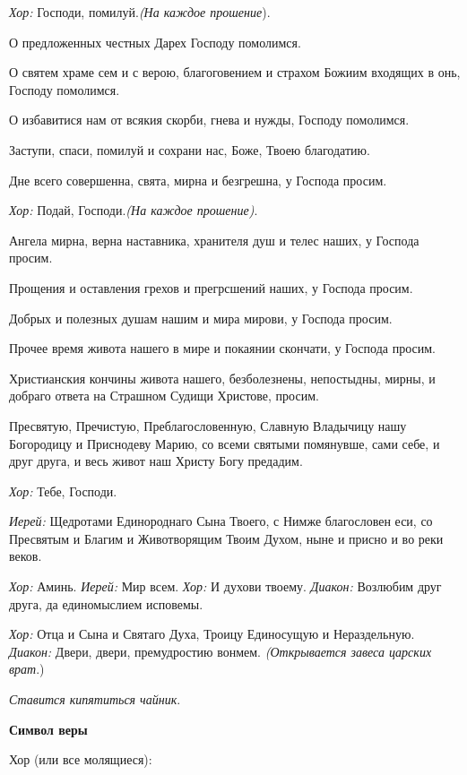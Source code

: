 {\itshape    Хор:} Господи, помилуй.{\itshape  (На каждое прошение}). 

   О предложенных честных Дарех Господу помолимся. 

   О святем храме сем и с верою, благоговением и страхом Божиим входящих в онь, Господу помолимся. 

   О избавитися нам от всякия скорби, гнева и нужды, Господу помолимся. 

   Заступи, спаси, помилуй и сохрани нас, Боже, Твоею благодатию. 

   Дне всего совершенна, свята, мирна и безгрешна, у Господа просим. 

{\itshape    Хор:} Подай, Господи.{\itshape  (На каждое прошение)}. 

   Ангела мирна, верна наставника, хранителя душ и телес наших, у Господа просим. 

   Прощения и оставления грехов и прегрсшений наших, у Господа просим. 

   Добрых и полезных душам нашим и мира мирови, у Господа просим. 

   Прочее время живота нашего в мире и покаянии скончати, у Господа просим. 

   Христианския кончины живота нашего, безболезнены, непостыдны, мирны, и добраго ответа на Страшном Судищи Христове, просим. 

   Пресвятую, Пречистую, Преблагословенную, Славную Владычицу нашу Богородицу и Приснодеву Марию, со всеми святыми помянувше, сами себе, и друг друга, и весь живот наш Христу Богу предадим.

 {\itshape Хор:} Тебе, Господи.

 {\itshape Иерей:} Щедротами Единороднаго Сына Твоего, с Нимже благословен еси, со Пресвятым и Благим и Животворящим Твоим Духом, ныне и присно и во реки веков.

 {\itshape Хор:} Аминь. {\itshape  Иерей:} Мир всем. {\itshape  Хор:} И духови твоему. {\itshape  Диакон:} Возлюбим друг друга, да единомыслием исповемы.

 {\itshape Хор:} Отца и Сына и Святаго Духа, Троицу Единосущую и Нераздельную. {\itshape  Диакон:} Двери, двери, премудростию вонмем. {\itshape  (Открывается завеса царских врат}.)

 

 {\itshape  Ставится кипятиться чайник}.  

\medskip 

 {\bfseries  Символ веры } 

  Хор (или все молящиеся):

